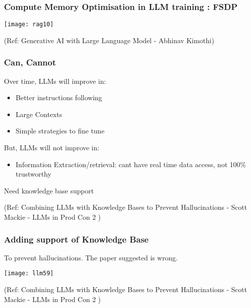 \begin{frame}[fragile]\frametitle{Compute Memory Optimisation in LLM training : FSDP}


		\begin{center}
		\texttt{[image: rag10]}
		\end{center}

{\tiny (Ref: Generative AI with Large Language Model - Abhinav  Kimothi)}

\end{frame}



\begin{frame}[fragile]\frametitle{Can, Cannot}

Over time, LLMs will improve in:
\begin{itemize}
\item Better instructions following
\item Large Contexts
\item Simple strategies to fine tune
\end{itemize}	

But, LLMs will not improve in:
\begin{itemize}
\item Information Extraction/retrieval: cant have real time data access, not 100\% trustworthy
\end{itemize}

Need knowledge base support

{\tiny (Ref: Combining LLMs with Knowledge Bases to Prevent Hallucinations - Scott Mackie - LLMs in Prod Con 2 )}

\end{frame}

\begin{frame}[fragile]\frametitle{Adding support of Knowledge Base}

To prevent hallucinations. The paper suggested is wrong.


\begin{center}
\texttt{[image: llm59]}
\end{center}		


{\tiny (Ref: Combining LLMs with Knowledge Bases to Prevent Hallucinations - Scott Mackie - LLMs in Prod Con 2 )}

\end{frame}


